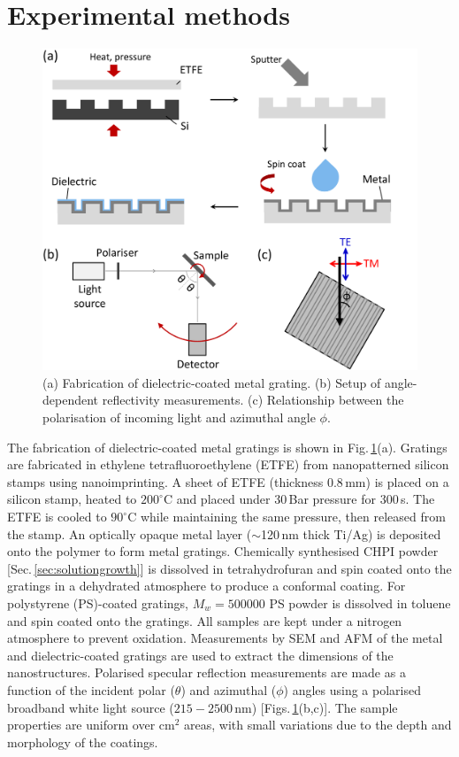 \section{Experimental methods}
\begin{figure}[h!] 
\centering    
\includegraphics[width=\textwidth]{Fig1}
\caption[(a) Fabrication and (b,c) setup of optical measurements on dielectric-coated metal gratings.]{(a) Fabrication of dielectric-coated metal grating. (b) Setup of angle-dependent reflectivity measurements. (c) Relationship between the polarisation of incoming light and azimuthal angle $\phi$.}
\label{7Fig1}
\end{figure}
The fabrication of dielectric-coated metal gratings is shown in Fig.\,\ref{7Fig1}(a). Gratings are fabricated in ethylene tetrafluoroethylene (ETFE) from nanopatterned silicon stamps using nanoimprinting. A sheet of ETFE (thickness 0.8\,mm) is placed on a silicon stamp, heated to $200^{\circ}$C and placed under 30\,Bar pressure for 300\,s. The ETFE is cooled to $90^{\circ}$C while maintaining the same pressure, then released from the stamp. An optically opaque metal layer ($\sim$120\,nm thick Ti/Ag) is deposited onto the polymer to form metal gratings. Chemically synthesised CHPI powder [Sec.\,\ref{sec:solutiongrowth}] is dissolved in tetrahydrofuran and spin coated onto the gratings in a dehydrated atmosphere to produce a conformal coating. For polystyrene (PS)-coated gratings, $M_w=500000$ PS powder is dissolved in toluene and spin coated onto the gratings. All samples are kept under a nitrogen atmosphere to prevent oxidation. Measurements by SEM and AFM of the metal and dielectric-coated gratings are used to extract the dimensions of the nanostructures. Polarised specular reflection measurements are made as a function of the incident polar ($\theta$) and azimuthal ($\phi$) angles using a polarised broadband white light source ($215-2500$\,nm) [Figs.\,\ref{7Fig1}(b,c)]. The sample properties are uniform over cm$^2$ areas, with small variations due to the depth and morphology of the coatings.

